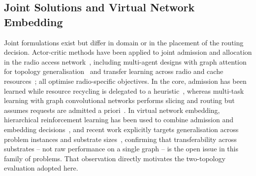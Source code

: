 \documentclass[10pt,journal,comsoc]{IEEEtran}
\begin{document}
\subsection{Joint Solutions and Virtual Network Embedding}
Joint formulations exist but differ in domain or in the placement of the
routing decision. Actor-critic methods have been applied to joint
admission and allocation in the radio access
network~\cite{Rezazadeh2021ZerotouchCN,9322237}, including multi-agent
designs with graph attention for topology
generalisation~\cite{9953137} and transfer learning across radio and
cache resources~\cite{zhou2022learning}; all optimise radio-specific
objectives. In the core, admission has been learned while resource
recycling is delegated to a heuristic~\cite{li2023reinforcement},
whereas multi-task learning with graph convolutional networks performs
slicing and routing but assumes requests are admitted a
priori~\cite{9655323}. In virtual network embedding, hierarchical
reinforcement learning has been used to combine admission and embedding
decisions~\cite{xiong2024hrlacra}, and recent work explicitly targets
generalisation across problem instances and substrate
sizes~\cite{wang2024flagvne}, confirming that transferability across
substrates -- not raw performance on a single graph -- is the open issue
in this family of problems. That observation directly motivates the
two-topology evaluation adopted here.
\end{document}
